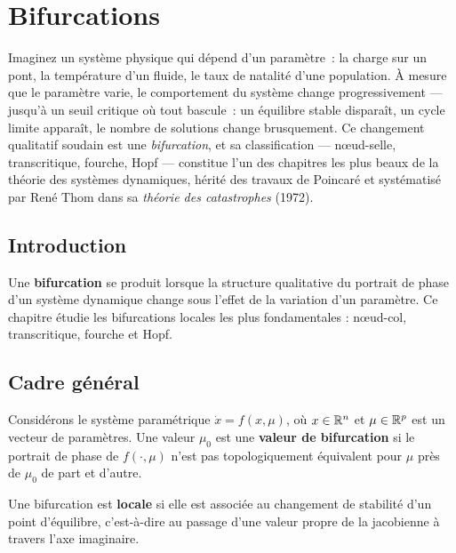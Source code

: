 \chapter{Bifurcations}
\label{ch:bifurcations}

Imaginez un syst\`eme physique qui d\'epend d'un param\`etre~: la charge sur un pont, la temp\'erature d'un fluide, le taux de natalit\'e d'une population. \`A mesure que le param\`etre varie, le comportement du syst\`eme change progressivement --- jusqu'\`a un seuil critique o\`u tout bascule~: un \'equilibre stable dispara\^it, un cycle limite appara\^it, le nombre de solutions change brusquement. Ce changement qualitatif soudain est une \emph{bifurcation}, et sa classification --- n\oe ud-selle, transcritique, fourche, Hopf --- constitue l'un des chapitres les plus beaux de la th\'eorie des syst\`emes dynamiques, h\'erit\'e des travaux de Poincar\'e et syst\'ematis\'e par Ren\'e Thom dans sa \emph{th\'eorie des catastrophes} (1972).

\section{Introduction}

Une \textbf{bifurcation} se produit lorsque la structure qualitative du
portrait de phase d'un syst\`eme dynamique change sous l'effet de la variation
d'un param\`etre. Ce chapitre \'etudie les bifurcations locales les plus
fondamentales : n\oe ud-col, transcritique, fourche et Hopf.

\section{Cadre g\'en\'eral}

\begin{definition}[Bifurcation]
Consid\'erons le syst\`eme param\'etrique $\dot{x} = f(x, \mu)$, o\`u
$x \in \mathbb{R}^n$ et $\mu \in \mathbb{R}^p$ est un vecteur de param\`etres. Une valeur
$\mu_0$ est une \textbf{valeur de bifurcation} si le portrait de phase de
$f(\cdot, \mu)$ n'est pas topologiquement \'equivalent pour $\mu$ pr\`es de
$\mu_0$ de part et d'autre.
\end{definition}

\begin{definition}
Une bifurcation est \textbf{locale} si elle est associ\'ee au changement de
stabilit\'e d'un point d'\'equilibre, c'est-\`a-dire au passage d'une valeur
propre de la jacobienne \`a travers l'axe imaginaire.
\end{definition}


